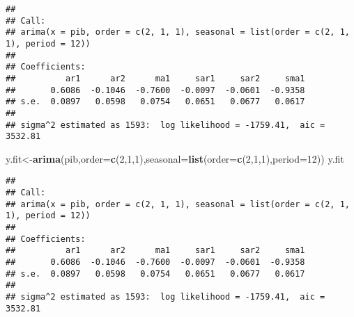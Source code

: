 \documentclass[]{article}
\newenvironment{Shaded}{\begin{snugshade}}{\end{snugshade}}
\newcommand{\CommentTok}[1]{\textcolor[rgb]{0.56,0.35,0.01}{\textit{#1}}}
\newcommand{\DataTypeTok}[1]{\textcolor[rgb]{0.13,0.29,0.53}{#1}}
\newcommand{\DecValTok}[1]{\textcolor[rgb]{0.00,0.00,0.81}{#1}}
\newcommand{\KeywordTok}[1]{\textcolor[rgb]{0.13,0.29,0.53}{\textbf{#1}}}
\newcommand{\NormalTok}[1]{#1}
\begin{document}
\begin{verbatim}
## 
## Call:
## arima(x = pib, order = c(2, 1, 1), seasonal = list(order = c(2, 1, 1), period = 12))
## 
## Coefficients:
##          ar1      ar2      ma1     sar1     sar2     sma1
##       0.6086  -0.1046  -0.7600  -0.0097  -0.0601  -0.9358
## s.e.  0.0897   0.0598   0.0754   0.0651   0.0677   0.0617
## 
## sigma^2 estimated as 1593:  log likelihood = -1759.41,  aic = 3532.81
\end{verbatim}

\begin{Shaded}
\begin{Highlighting}[]
\NormalTok{y.fit<-}\KeywordTok{arima}\NormalTok{(pib,}\DataTypeTok{order=}\KeywordTok{c}\NormalTok{(}\DecValTok{2}\NormalTok{,}\DecValTok{1}\NormalTok{,}\DecValTok{1}\NormalTok{),}\DataTypeTok{seasonal=}\KeywordTok{list}\NormalTok{(}\DataTypeTok{order=}\KeywordTok{c}\NormalTok{(}\DecValTok{2}\NormalTok{,}\DecValTok{1}\NormalTok{,}\DecValTok{1}\NormalTok{),}\DataTypeTok{period=}\DecValTok{12}\NormalTok{))}
\NormalTok{y.fit}
\end{Highlighting}
\end{Shaded}

\begin{verbatim}
## 
## Call:
## arima(x = pib, order = c(2, 1, 1), seasonal = list(order = c(2, 1, 1), period = 12))
## 
## Coefficients:
##          ar1      ar2      ma1     sar1     sar2     sma1
##       0.6086  -0.1046  -0.7600  -0.0097  -0.0601  -0.9358
## s.e.  0.0897   0.0598   0.0754   0.0651   0.0677   0.0617
## 
## sigma^2 estimated as 1593:  log likelihood = -1759.41,  aic = 3532.81
\end{verbatim}

\begin{Shaded}
\end{Shaded}
\end{document}
